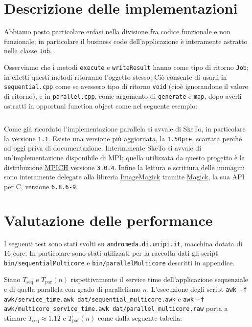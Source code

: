 \documentclass[12pt]{article}
\newcommand{\cpp}{C\nolinebreak\hspace{-.05em}\raisebox{.4ex}{\tiny\bf +}\nolinebreak\hspace{-.10em}\raisebox{.4ex}{\tiny\bf +}}
\newcommand{\mpp}{Magick\nolinebreak\hspace{-.05em}\raisebox{.4ex}{\tiny\bf +}\nolinebreak\hspace{-.10em}\raisebox{.4ex}{\tiny\bf +}}
\begin{document}
    \section{Descrizione delle implementazioni}

    Abbiamo posto particolare enfasi nella divisione fra codice funzionale e
    non funzionale; in particolare il business code dell'applicazione è
    interamente astratto nella classe \texttt{Job}.

    Osserviamo che i metodi \texttt{execute} e \texttt{writeResult} hanno
    come tipo di ritorno \texttt{Job}; in effetti questi metodi ritornano
    l'oggetto stesso. Ciò consente di usarli in \texttt{sequential.cpp} come
    se avessero tipo di ritorno \texttt{void} (cio\`e ignorandone il valore
    di ritorno), e in \texttt{parallel.cpp}, come argomento di
    \texttt{generate} e \texttt{map}, dopo averli astratti in opportuni
    function object come nel seguente esempio:

    \inputminted[]{c++}{tex/src/function-object.cpp}

    Come gi\`a ricordato l'implementazione parallela si avvale di SkeTo, in
    particolare la versione \texttt{1.1}. Esiste una versione pi\`u aggiornata,
    la \texttt{1.50pre}, scartata perch\'e ad oggi priva di documentazione.
    Internamente SkeTo si avvale di un'implementazione disponibile di MPI;
    quella utilizzata da questo progetto \`e la distribuzione
    \href{http://www.mpich.org}{\underline{MPICH}} versione \texttt{3.0.4}. 
    Infine la lettura e scrittura delle immagini sono interamente delegate alla
    libreria \href{http://www.imagemagick.org/script/index.php}{\underline{ImageMagick}}
    tramite \href{http://www.imagemagick.org/script/magick++.php}{\underline{\mpp}},
    la sua API per \cpp, versione \texttt{6.8.6-9}.

    \section{Valutazione delle performance}

    I seguenti test sono stati svolti su \texttt{andromeda.di.unipi.it},
    macchina dotata di 16 core. In particolare sono stati utilizzati per
    la raccolta dati gli script \texttt{bin/sequentialMulticore} e
    \texttt{bin/parallelMulticore} descritti in appendice.

    Siano \(T_{\text{seq}}\) e \(T_{\text{par}}(n)\) rispettivamente il 
    service time dell'applicazione sequenziale e di quella parallela con
    grado di parallelismo \(n\). L'esecuzione degli script
    \texttt{awk -f awk/service\_time.awk dat/sequential\_multicore.awk} e
    \texttt{awk -f awk/multicore\_service\_time.awk dat/parallel\_multicore.raw} porta a stimare
    \(T_{\text{seq}} \approx 1.12\) e \(T_{\text{par}}(n)\) come
    dalla seguente tabella:
\end{document}
